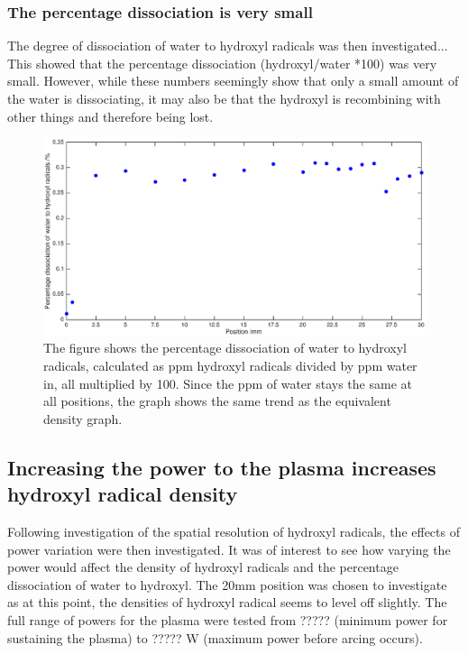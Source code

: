 \documentclass[11pt, oneside]{article}   	%
\begin{document}
\subsubsection{The percentage dissociation is very small}

The degree of dissociation of water to hydroxyl radicals was then investigated... 
This showed that the percentage dissociation (hydroxyl/water *100) was very small.
However, while these numbers seemingly show that only a small amount of the water is dissociating, it may also be that the hydroxyl is recombining with other things and therefore being lost.

\begin{figure}
	\centering
	\includegraphics[width=\textwidth]{Figures/SpatialDissociation2.eps}
	\caption{The figure shows the percentage dissociation of water to hydroxyl radicals, calculated as ppm hydroxyl radicals divided by ppm water in, all multiplied by 100. Since the ppm of water stays the same at all positions, the graph shows the same trend as the equivalent density graph.}
	\label{fig:SpatialDissociation}
\end{figure}


\subsection{Increasing the power to the plasma increases hydroxyl radical density}

Following investigation of the spatial resolution of hydroxyl radicals, the effects of power variation were then investigated.
It was of interest to see how varying the power would affect the density of hydroxyl radicals and the percentage dissociation of water to hydroxyl.
The 20mm position was chosen to investigate as at this point, the densities of hydroxyl radical seems to level off slightly. 
The full range of powers for the plasma were tested from ????? (minimum power for sustaining the plasma) to ????? W (maximum power before arcing occurs).
\end{document}

